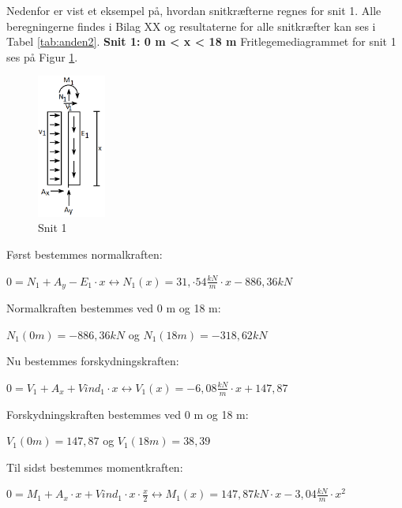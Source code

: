 Nedenfor er vist et eksempel på, hvordan snitkræfterne regnes for snit 1. Alle beregningerne findes i Bilag XX og resultaterne for alle snitkræfter kan ses i Tabel \ref{tab:anden2}.
\newline
\newline
\textbf{Snit 1: 0 m < x < 18 m}
\newline
Fritlegemediagrammet for snit 1 ses på Figur \ref{fig:snitetan}.
\begin{figure}[H]
	\centering
	\includegraphics[width=0.2\textwidth]{billeder/asnitet.png}
	\caption{Snit 1}
	\label{fig:snitetan}
\end{figure}

Først bestemmes normalkraften:
\begin{center}
	$0 = N_1 + A_y - E_1\cdot x \leftrightarrow N_1(x) = 31,\cdot54 \frac{kN}{m} \cdot x - 886,\!36 kN$
\end{center}

Normalkraften bestemmes ved 0 m og 18 m:
\begin{center}
	$N_1(0m) = -886,\!36 kN$ og $N_1(18m) = -318,\!62 kN$
\end{center}

Nu bestemmes forskydningskraften:
\begin{center}
	$0 = V_1 + A_x + Vind_1 \cdot x \leftrightarrow V_1(x) = -6,\!08 \frac{kN}{m} \cdot x + 147,\!87$
\end{center}

Forskydningskraften bestemmes ved 0 m og 18 m:
\begin{center}
	$V_1(0m) = 147,\!87$ og $V_1(18m) = 38,\!39$
\end{center}

Til sidst bestemmes momentkraften:
\begin{center}
	$0 = M_1 + A_x \cdot x + Vind_1\cdot x\cdot \frac{x}{2} \leftrightarrow M_1(x) = 147,\!87 kN\cdot x - 3,\!04 \frac{kN}{m}\cdot x^2$
\end{center}

